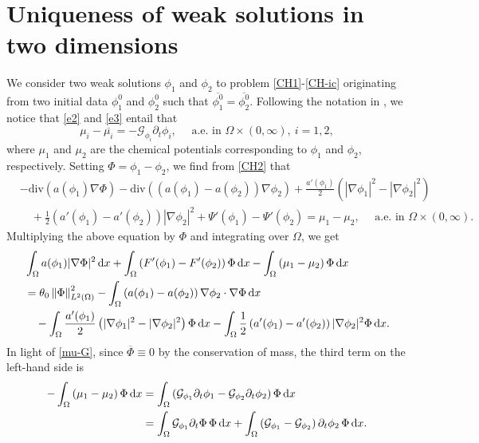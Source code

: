 \documentclass[11pt,reqno]{amsart}
\theoremstyle{remark}
\newcommand \norm[1] {\left\Vert #1\right\Vert}
\def\G{\mathcal{G}}
\def\d{{\rm d}}
\def\uu{\boldsymbol{u}}
\def\div{\mathrm{div}}
\numberwithin{equation}{section}
\def\d{{\rm d}}
\begin{document}
\section{Uniqueness of weak solutions in two dimensions}
\label{W-uniq}

We consider two weak solutions $\phi_1$ and $\phi_2$  to problem \eqref{CH1}-\eqref{CH-ic} originating from two initial data $\phi_{1}^0$ and $\phi_2^0$ such that $\overline{\phi_{1}^0}=\overline{\phi_{2}^0}$.
Following the notation in \cite{CGGG2025}, we notice that \eqref{e2} and \eqref{e3} entail that
\begin{equation}
\label{mu-G}
\mu_i-\overline{\mu_i}= - \mathcal{G}_{\phi_i} \partial_t \phi_i, \quad
\text{ a.e. in } \Omega\times (0,\infty), \ i=1,2,
\end{equation}
where $\mu_1$ and $\mu_2$ are the chemical potentials corresponding to $\phi_1$ and $\phi_2$, respectively.
Setting $\Phi=\phi_1-\phi_2$, we find from \eqref{CH2} that
\begin{align*}
&-\div \left( a(\phi_1) \nabla \Phi \right)
-\div \left( (a(\phi_1)-a(\phi_2)) \nabla \phi_2 \right)
+\frac{a'(\phi_1)}{2} \left( |\nabla \phi_1|^2 - |\nabla \phi_2|^2 \right)
\\
&\quad
+ \frac12 \left( a'(\phi_1)-a'(\phi_2)\right) | \nabla \phi_2|^2
+ \Psi'(\phi_1)-\Psi'(\phi_2)= \mu_1-\mu_2,  \quad
\text{ a.e. in } \Omega\times (0,\infty).
\end{align*}
Multiplying the above equation by $\Phi$ and integrating over $\Omega$, we get
 \begin{align*}
& \int_\Omega a(\phi_1) |\nabla \Phi |^2 \, \d x
 +
  \int_\Omega \left( F'(\phi_1)-F'(\phi_2) \right)   \Phi \, \d x
- \int_{\Omega} \left( \mu_1-\mu_2\right)  \Phi \, \d x
\\
&=
 \theta_0 \norm{\Phi}_{L^2(\Omega)}^2
 - \int_\Omega \left( a(\phi_1)-a(\phi_2)\right) \nabla \phi_2 \cdot \nabla \Phi \, \d x
 \\
 &\quad -\int_\Omega \frac{a'(\phi_1)}{2}  \left( |\nabla \phi_1|^2-|\nabla \phi_2|^2\right) \Phi
 \, \d x
 - \int_\Omega \frac12  \left( a'(\phi_1)-a'(\phi_2)\right) | \nabla \phi_2|^2 \Phi \, \d x.
\end{align*}
In light of \eqref{mu-G}, since $\overline{\Phi}\equiv 0$ by the conservation of mass, the third term on the left-hand side is
\begin{align*}
- \int_{\Omega} \left( \mu_1-\mu_2\right)  \Phi \, \d x
&=
 \int_\Omega \left( \G_{\phi_1}  \partial_t \phi_1 - \G_{\phi_2} \partial_t \phi_2  \right)  \Phi \, \d x
 \\
 &=
\int_\Omega  \G_{\phi_1} \partial_t \Phi  \, \Phi \, \d x
+
\int_\Omega \left( \G_{\phi_1}-\G_{\phi_2} \right)
  \partial_t \phi_2 \,  \Phi \, \d x.
\end{align*}
\end{document}
